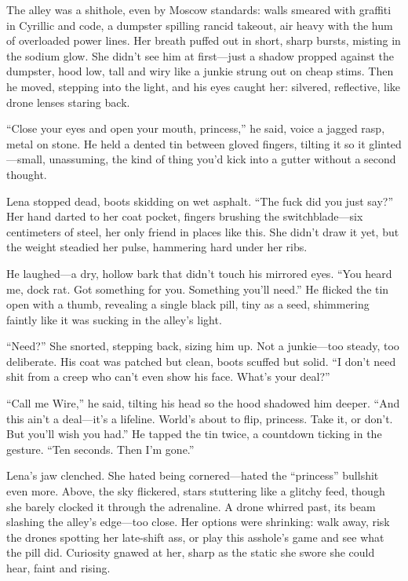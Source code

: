 \documentclass[12pt]{book}
\begin{document}
The alley was a shithole, even by Moscow standards: walls smeared with graffiti in Cyrillic and code, a dumpster spilling rancid takeout, air heavy with the hum of overloaded power lines. Her breath puffed out in short, sharp bursts, misting in the sodium glow. She didn't see him at first---just a shadow propped against the dumpster, hood low, tall and wiry like a junkie strung out on cheap stims. Then he moved, stepping into the light, and his eyes caught her: silvered, reflective, like drone lenses staring back.

``Close your eyes and open your mouth, princess,'' he said, voice a jagged rasp, metal on stone. He held a dented tin between gloved fingers, tilting it so it glinted---small, unassuming, the kind of thing you'd kick into a gutter without a second thought.

Lena stopped dead, boots skidding on wet asphalt. ``The fuck did you just say?'' Her hand darted to her coat pocket, fingers brushing the switchblade---six centimeters of steel, her only friend in places like this. She didn't draw it yet, but the weight steadied her pulse, hammering hard under her ribs.

He laughed---a dry, hollow bark that didn't touch his mirrored eyes. ``You heard me, dock rat. Got something for you. Something you'll need.'' He flicked the tin open with a thumb, revealing a single black pill, tiny as a seed, shimmering faintly like it was sucking in the alley's light.

``Need?'' She snorted, stepping back, sizing him up. Not a junkie---too steady, too deliberate. His coat was patched but clean, boots scuffed but solid. ``I don't need shit from a creep who can't even show his face. What's your deal?''

``Call me Wire,'' he said, tilting his head so the hood shadowed him deeper. ``And this ain't a deal---it's a lifeline. World's about to flip, princess. Take it, or don't. But you'll wish you had.'' He tapped the tin twice, a countdown ticking in the gesture. ``Ten seconds. Then I'm gone.''

Lena's jaw clenched. She hated being cornered---hated the ``princess'' bullshit even more. Above, the sky flickered, stars stuttering like a glitchy feed, though she barely clocked it through the adrenaline. A drone whirred past, its beam slashing the alley's edge---too close. Her options were shrinking: walk away, risk the drones spotting her late-shift ass, or play this asshole's game and see what the pill did. Curiosity gnawed at her, sharp as the static she swore she could hear, faint and rising.
\end{document}
